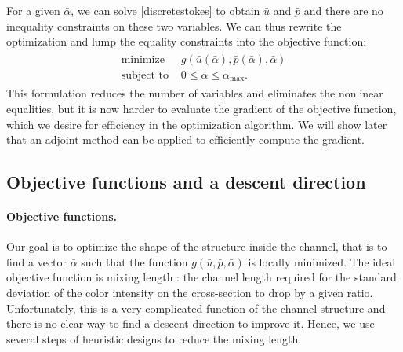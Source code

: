 
For a given $\bar{\alpha}$, we can solve \eqref{discretestokes} to
obtain $\bar{u}$ and $\bar{p}$ and there are no inequality constraints
on these two variables. We can thus rewrite the optimization and lump
the equality constraints into the objective function:
\begin{eqnarray}\label{topoptform}
  \begin{array}{ll}
    \text{minimize } & g(\bar{u}(\bar{\alpha}),
    \bar{p}(\bar{\alpha}), \bar{\alpha})
    \\ \text{subject to } & 0\le \bar{\alpha} \le \alpha_\text{max}.
  \end{array}
\end{eqnarray}
This formulation reduces the number of variables and eliminates the
nonlinear equalities, but it is now harder to evaluate the gradient of
the objective function, which we desire for efficiency in the
optimization algorithm. We will show later that an adjoint method can
be applied to efficiently compute the gradient.

\subsection{Objective functions and a descent direction}

\paragraph{Objective functions.}
Our goal is to optimize the shape of the structure inside the channel,
that is to find a vector $\bar{\alpha}$ such that the function
$g(\bar{u},\bar{p},\bar{\alpha})$ is locally minimized. The ideal
objective function is mixing length \cite{Stroock2002}: the channel
length required for the standard deviation of the color intensity on
the cross-section to drop by a given ratio. Unfortunately, this is a
very complicated function of the channel structure and there is no
clear way to find a descent direction to improve it. Hence, we use
several steps of heuristic designs to reduce the mixing length.

